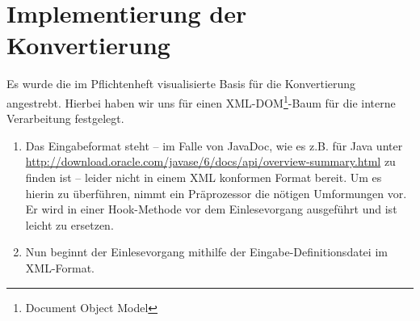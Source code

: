 \documentclass[	a4paper,		%
		titlepage, 		%
		fontsize=12pt		%
		]{scrartcl} 		%
\begin{document}
\section{Implementierung der Konvertierung}
Es wurde die im Pflichtenheft visualisierte Basis für die Konvertierung angestrebt. Hierbei haben wir uns für einen XML-DOM\footnote{Document Object Model}-Baum für die interne Verarbeitung festgelegt.
\begin{enumerate}
 \item Das Eingabeformat steht -- im Falle von JavaDoc, wie es z.B. für Java unter \href{http://download.oracle.com/javase/6/docs/api/overview-summary.html}{http://download.oracle.com/javase/6/docs/api/overview-summary.html} zu finden ist -- leider nicht in einem XML konformen Format bereit. Um es hierin zu überführen, nimmt ein Präprozessor die nötigen Umformungen vor. Er wird in einer Hook-Methode vor dem Einlesevorgang ausgeführt und ist leicht zu ersetzen.
 \item Nun beginnt der Einlesevorgang mithilfe der Eingabe-Definitionsdatei im XML-Format.
\end{enumerate}




\begin{figure} [H]
\centering
\resizebox*{.70\textheight}{!}{}
\end{figure}
\end{document}
